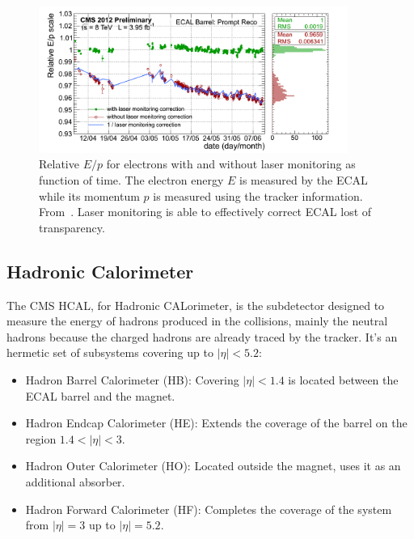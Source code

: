 \begin{figure}[!Hhtbp]
  \begin{center}
    \includegraphics[width=0.9\textwidth]{figs/EoverP_history_2012.png}
    \caption{Relative $E/p$ for electrons with and without laser monitoring as function of time. The electron energy $E$ is measured by the ECAL while its momentum $p$ is measured using the tracker information. From~\cite{CMS-DP-2012-015}. Laser monitoring is able to effectively correct ECAL lost of transparency.}
    \label{figs:RelEp}
  \end{center}
\end{figure}


\subsection{Hadronic Calorimeter}
\label{sec:hcal}

The CMS HCAL, for Hadronic CALorimeter, is the subdetector designed to measure the energy of hadrons produced in the collisions, mainly the neutral hadrons because the charged hadrons are already traced by the tracker. It's an hermetic set of subsystems covering up to $|\eta|<5.2$:
\begin{itemize}
\item Hadron Barrel Calorimeter (HB): Covering $|\eta|<1.4$ is located between the ECAL barrel and the magnet. 
\item Hadron Endcap Calorimeter (HE): Extends the coverage of the barrel on the region $1.4<|\eta|<3$.
\item Hadron Outer Calorimeter (HO): Located outside the magnet, uses it as an additional absorber.
\item Hadron Forward Calorimeter (HF): Completes the coverage of the system from $|\eta|=3$ up to $|\eta|=5.2$.
\end{itemize}

